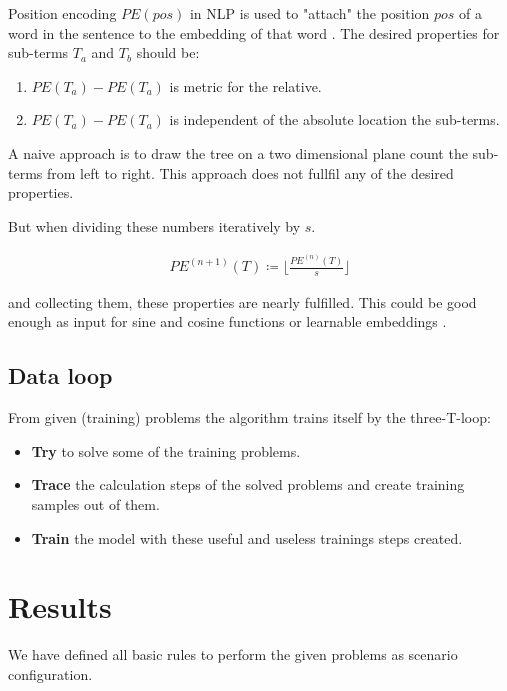 \documentclass{scrartcl}
\theoremstyle{definition}
\begin{document}
Position encoding $PE\left( pos\right)$ in NLP is used to "attach" the position $pos$ of a word in the sentence to the embedding of that word \cite{vaswani2017attention}.
The desired properties for sub-terms $T_a$ and $T_b$ should be:
\begin{enumerate}
	\item $PE\left( T_a \right) - PE\left( T_a \right)$ is metric for the relative.
	\item $PE\left( T_a \right) - PE\left( T_a \right)$ is independent of the absolute location the sub-terms.
\end{enumerate}

A naive approach is to draw the tree on a two dimensional plane count the sub-terms from left to right.
This approach does not fullfil any of the desired properties.

But when dividing these numbers iteratively by $s$.

\begin{align}
	PE^{(n+1)}\left( T \right) \coloneqq \lfloor \frac{PE^{(n)} \left( T \right)}{s} \rfloor
\end{align}

and collecting them, these properties are nearly fulfilled. 
This could be good enough as input for sine and cosine functions or learnable embeddings \cite{gehring2017convolutional}.


\subsection{Data loop}

From given (training) problems the algorithm trains itself by the three-T-loop: 

\begin{itemize}
	\item \textbf{Try} to solve some of the training problems.
	\item \textbf{Trace} the calculation steps of the solved problems and create training samples out of them.
	\item \textbf{Train} the model with these useful and useless trainings steps created.
\end{itemize}

\section{Results}
We have defined all basic rules to perform the given problems as scenario configuration.
\end{document}
